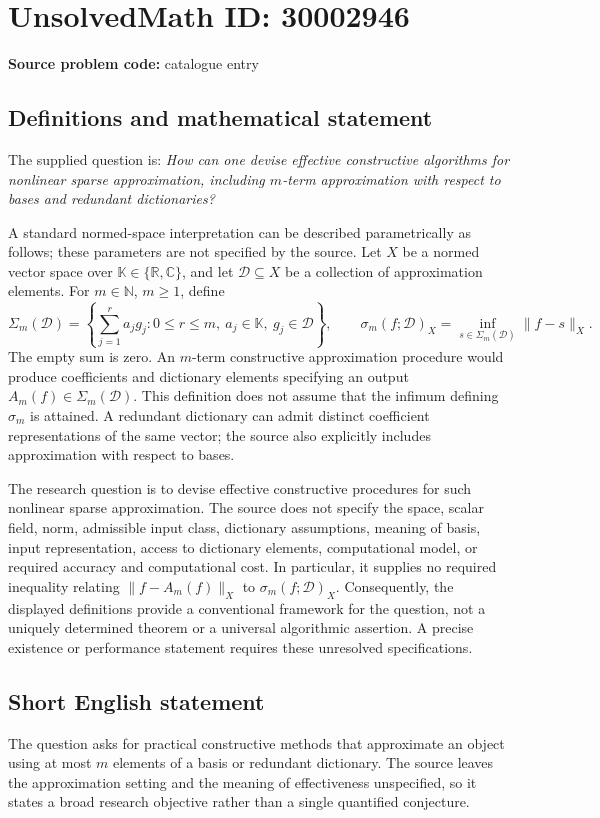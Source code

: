 \documentclass[11pt]{article}
\newcommand{\N}{\mathbb{N}}
\newcommand{\R}{\mathbb{R}}
\newcommand{\C}{\mathbb{C}}
\begin{document}
\section*{UnsolvedMath ID: 30002946}
\textbf{Source problem code:} catalogue entry
\subsection{Definitions and mathematical statement}
The supplied question is: \emph{How can one devise effective constructive algorithms for nonlinear sparse approximation, including \(m\)-term approximation with respect to bases and redundant dictionaries?}

A standard normed-space interpretation can be described parametrically as follows; these parameters are not specified by the source. Let \(X\) be a normed vector space over \(\mathbb K\in\{\R,\C\}\), and let \(\mathcal D\subseteq X\) be a collection of approximation elements. For \(m\in\N\), \(m\geq1\), define
\[
\Sigma_m(\mathcal D)=\left\{\sum_{j=1}^{r}a_jg_j:0\leq r\leq m,\ a_j\in\mathbb K,\ g_j\in\mathcal D\right\},
\qquad
\sigma_m(f;\mathcal D)_X=\inf_{s\in\Sigma_m(\mathcal D)}\|f-s\|_X.
\]
The empty sum is zero. An \(m\)-term constructive approximation procedure would produce coefficients and dictionary elements specifying an output \(A_m(f)\in\Sigma_m(\mathcal D)\). This definition does not assume that the infimum defining \(\sigma_m\) is attained. A redundant dictionary can admit distinct coefficient representations of the same vector; the source also explicitly includes approximation with respect to bases.

The research question is to devise effective constructive procedures for such nonlinear sparse approximation. The source does not specify the space, scalar field, norm, admissible input class, dictionary assumptions, meaning of basis, input representation, access to dictionary elements, computational model, or required accuracy and computational cost. In particular, it supplies no required inequality relating \(\|f-A_m(f)\|_X\) to \(\sigma_m(f;\mathcal D)_X\). Consequently, the displayed definitions provide a conventional framework for the question, not a uniquely determined theorem or a universal algorithmic assertion. A precise existence or performance statement requires these unresolved specifications.
\subsection{Short English statement}
The question asks for practical constructive methods that approximate an object using at most \(m\) elements of a basis or redundant dictionary. The source leaves the approximation setting and the meaning of effectiveness unspecified, so it states a broad research objective rather than a single quantified conjecture.
\end{document}
